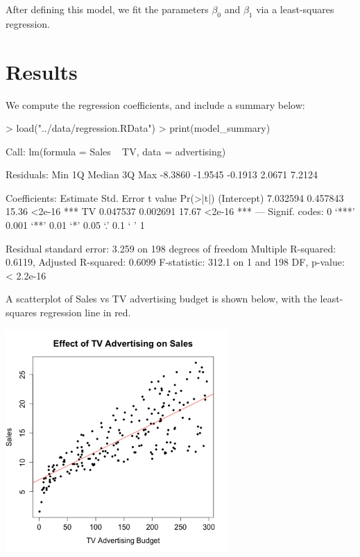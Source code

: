 \documentclass{article}
\begin{document}
After defining this model, we fit the parameters $\beta_0$ and $\beta_1$ via a least-squares regression.

\section{Results}

We compute the regression coefficients, and include a summary below:

\begin{Schunk}
\begin{Sinput}
> load("../data/regression.RData")
> print(model_summary)
\end{Sinput}
\begin{Soutput}
Call:
lm(formula = Sales ~ TV, data = advertising)

Residuals:
    Min      1Q  Median      3Q     Max 
-8.3860 -1.9545 -0.1913  2.0671  7.2124 

Coefficients:
            Estimate Std. Error t value Pr(>|t|)    
(Intercept) 7.032594   0.457843   15.36   <2e-16 ***
TV          0.047537   0.002691   17.67   <2e-16 ***
---
Signif. codes:  0 ‘***’ 0.001 ‘**’ 0.01 ‘*’ 0.05 ‘.’ 0.1 ‘ ’ 1

Residual standard error: 3.259 on 198 degrees of freedom
Multiple R-squared:  0.6119,	Adjusted R-squared:  0.6099 
F-statistic: 312.1 on 1 and 198 DF,  p-value: < 2.2e-16
\end{Soutput}
\end{Schunk}

A scatterplot of Sales vs TV advertising budget is shown below, with the least-squares regression line in red.

\includegraphics[width=240pt]{../images/scatterplot-tv-sales.png}
\end{document}
